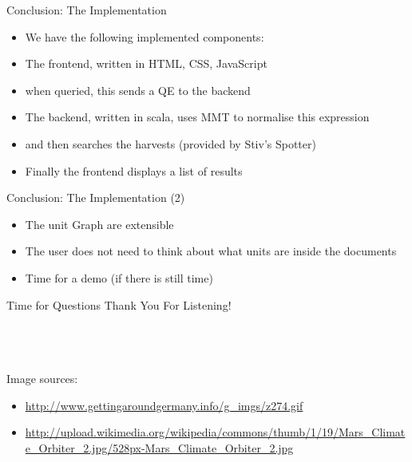 \documentclass{beamer}
\begin{document}
  \begin{frame}{Conclusion: The Implementation}
    \begin{itemize}[<+->]
      \item We have the following implemented components:
      \item The frontend, written in HTML, CSS, JavaScript
      \item when queried, this sends a QE to the backend
      \item The backend, written in scala, uses MMT to normalise this expression
      \item and then searches the harvests (provided by Stiv's Spotter)
      \item Finally the frontend displays a list of results
    \end{itemize}
  \end{frame}

  \begin{frame}{Conclusion: The Implementation (2)}
    \begin{itemize}[<+->]
      \item The unit Graph are extensible
      \item The user does not need to think about what units are inside the documents
      \item Time for a demo (if there is still time)
    \end{itemize}
  \end{frame}

  \begin{frame}{Time for Questions}
    \huge{Thank You For Listening!}
    \\\ \\\ \\\
    \tiny{
    Image sources: \\
      \begin{itemize}
        \item \url{http://www.gettingaroundgermany.info/g_imgs/z274.gif}
        \item \url{http://upload.wikimedia.org/wikipedia/commons/thumb/1/19/Mars_Climate_Orbiter_2.jpg/528px-Mars_Climate_Orbiter_2.jpg}
      \end{itemize}
    }

  \end{frame}

\end{document}

